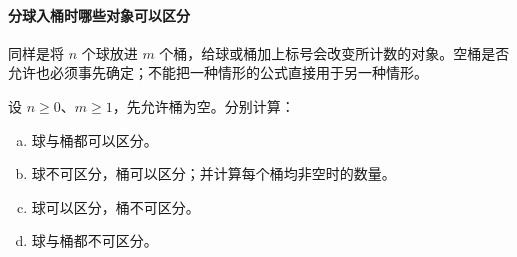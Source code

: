 \documentclass[lang=cn,a4paper,fontset=none,zihao=false,10pt,openany,twoside]{beautybook}
\numberwithin{algorithm}{chapter}
\begin{document}
\paragraph{分球入桶时哪些对象可以区分}
同样是将 $n$ 个球放进 $m$ 个桶，给球或桶加上标号会改变所计数的对象。空桶是否允许也必须事先确定；不能把一种情形的公式直接用于另一种情形。
\begin{example}[分球入桶的四种情形]\label{ex:balls-bins}
设 $n\ge0$、$m\ge1$，先允许桶为空。分别计算：
\begin{enumerate}[(a)]
\item 球与桶都可以区分。
\item 球不可区分，桶可以区分；并计算每个桶均非空时的数量。
\item 球可以区分，桶不可区分。
\item 球与桶都不可区分。
\end{enumerate}
\end{example}
\end{document}
